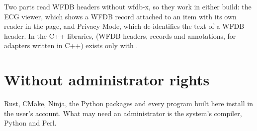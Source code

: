 Two parts read WFDB headers without wfdb-x, so they work in either build: the ECG viewer, which
shows a WFDB record attached to an item with its own reader in the page, and Privacy Mode, which
de-identifies the text of a WFDB header. In the C++ libraries,  (WFDB
headers, records and annotations, for adapters written in C++) exists only with
.

\section{Without administrator rights}
\label{sec:installation-no-admin}

Rust, CMake, Ninja, the Python packages and every program built here install in the user's
account. What may need an administrator is the system's compiler, Python and Perl.


